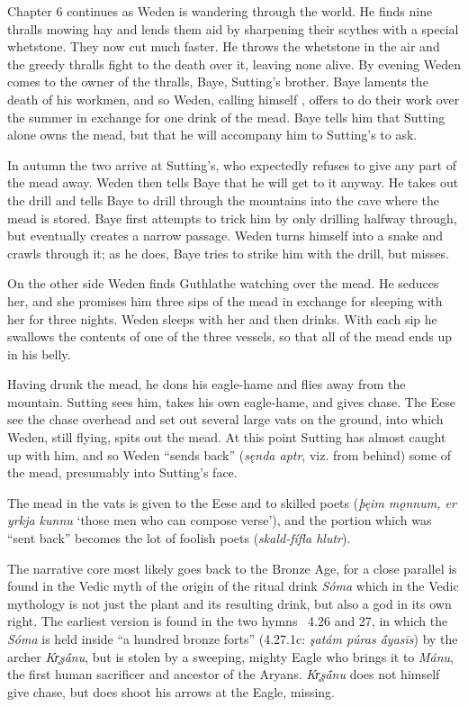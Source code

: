 	{\small Chapter 6 continues as Weden is wandering through the world.  He finds nine thralls mowing hay and lends them aid by sharpening their scythes with a special whetstone.  They now cut much faster.  He throws the whetstone in the air and the greedy thralls fight to the death over it, leaving none alive.  By evening Weden comes to the owner of the thralls, Baye, Sutting’s brother.  Baye laments the death of his workmen, and so Weden, calling himself , offers to do their work over the summer in exchange for one drink of the mead.  Baye tells him that Sutting alone owns the mead, but that he will accompany him to Sutting’s to ask.

	In autumn the two arrive at Sutting’s, who expectedly refuses to give any part of the mead away.  Weden then tells Baye that he will get to it anyway.  He takes out the drill  and tells Baye to drill through the mountains into the cave where the mead is stored. Baye first attempts to trick him by only drilling halfway through, but eventually creates a narrow passage. Weden turns himself into a snake and crawls through it; as he does, Baye tries to strike him with the drill, but misses.

	On the other side Weden finds Guthlathe watching over the mead.  He seduces her, and she promises him three sips of the mead in exchange for sleeping with her for three nights.  Weden sleeps with her and then drinks.  With each sip he swallows the contents of one of the three vessels, so that all of the mead ends up in his belly.

	Having drunk the mead, he dons his eagle-hame and flies away from the mountain.  Sutting sees him, takes his own eagle-hame, and gives chase.  The Eese see the chase overhead and set out several large vats on the ground, into which Weden, still flying, spits out the mead. At this point Sutting has almost caught up with him, and so Weden “sends back” (\emph{sęnda aptr}, viz. from behind) some of the mead, presumably into Sutting’s face.

	The mead in the vats is given to the Eese and to skilled poets (\emph{þęim mǫnnum, er yrkja kunnu} ‘those men who can compose verse’), and the portion which was “sent back” becomes the lot of foolish poets (\emph{skald-fífla hlutr}).}

The narrative core most likely goes back to the Bronze Age, for a close parallel is found in the Vedic myth of the origin of the ritual drink \emph{Sóma} which in the Vedic mythology is not just the plant and its resulting drink, but also a god in its own right.  The earliest version is found in the two hymns \Rigveda\ 4.26 and 27, in which the \emph{Sóma} is held inside “a hundred bronze forts” (4.27.1c: \emph{şatám púras ā́yasīs}) by the archer \emph{Kr̥şā́nu}, but is stolen by a sweeping, mighty Eagle who brings it to \emph{Mánu}, the first human sacrificer and ancestor of the Aryans.  \emph{Kr̥şā́nu} does not himself give chase, but does shoot his arrows at the Eagle, missing.

